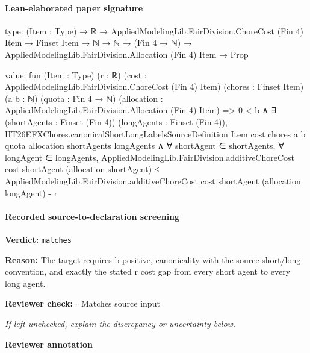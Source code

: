 \documentclass[10pt]{article}
\newcommand{\reviewerbox}{%
  \par\noindent\fbox{\parbox{0.96\linewidth}{\rule{0pt}{0.38in}}}\par
}
\newcommand{\reviewmatch}[1]{%
  \par\noindent\textbf{Reviewer check:} $\square$\; #1\par
  \noindent\emph{If left unchecked, explain the discrepancy or uncertainty below.}\par
}
\begin{document}



\paragraph{Lean-elaborated paper signature}
\begin{ReviewVerbatim}
type:
(Item : Type) →
  ℝ →
    AppliedModelingLib.FairDivision.ChoreCost (Fin 4) Item →
      Finset Item → ℕ → ℕ → (Fin 4 → ℕ) → AppliedModelingLib.FairDivision.Allocation (Fin 4) Item → Prop

value:
fun (Item : Type) (r : ℝ) (cost : AppliedModelingLib.FairDivision.ChoreCost (Fin 4) Item) (chores : Finset Item)
    (a b : ℕ) (quota : Fin 4 → ℕ) (allocation : AppliedModelingLib.FairDivision.Allocation (Fin 4) Item) =>
  0 < b ∧
    ∃ (shortAgents : Finset (Fin 4)) (longAgents : Finset (Fin 4)),
      HT26EFXChores.canonicalShortLongLabelsSourceDefinition Item cost chores a b quota allocation shortAgents
          longAgents ∧
        ∀ shortAgent ∈ shortAgents,
          ∀ longAgent ∈ longAgents,
            AppliedModelingLib.FairDivision.additiveChoreCost cost shortAgent (allocation shortAgent) ≤
              AppliedModelingLib.FairDivision.additiveChoreCost cost shortAgent (allocation longAgent) - r
\end{ReviewVerbatim}


\paragraph{Recorded source-to-declaration screening}
\textbf{Verdict:} \texttt{matches}
\\
{\raggedright
\textbf{Reason:} The target requires b positive, canonicality with the source short/\allowbreak{}long convention, and exactly the stated r cost gap from every short agent to every long agent.\allowbreak{}
\par}
\reviewmatch{Matches source input}
\noindent\textbf{Reviewer annotation}\par
\reviewerbox
\end{document}
